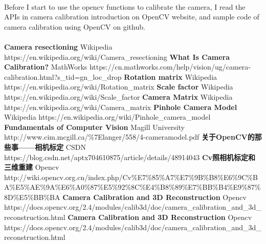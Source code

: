 \documentclass{article}
\begin{document}
\paragraph{}Before I start to use the opencv functions to calibrate the camera, I read the APIs in camera calibration introduction on OpenCV website\cite{OpencvCameraCalibration}, and sample code of camera calibration using OpenCV on github\cite{CalibrationGithub}.
\paragraph{}

\begin{thebibliography}{99}
\textbf{Camera resectioning}  Wikipedia  https://en.wikipedia.org/wiki/Camera\_resectioning
\textbf{What Is Camera Calibration?}  MathWorks  https://cn.mathworks.com/help/vision/ug/camera-calibration.html?s\_tid=gn\_loc\_drop
\textbf{Rotation matrix}  Wikipedia   https://en.wikipedia.org/wiki/Rotation\_matrix
\textbf{Scale factor}  Wikipedia  https://en.wikipedia.org/wiki/Scale\_factor
\textbf{Camera Matrix}   Wikipedia  https://en.wikipedia.org/wiki/Camera\_matrix
\textbf{Pinhole Camera Model}   Wikipedia   https://en.wikipedia.org/wiki/Pinhole\_camera\_model
\textbf{Fundamentals of Computer Vision} Magill University  http://www.cim.mcgill.ca/\%7Elanger/558/4-cameramodel.pdf
\textbf{关于OpenCV的那些事——相机标定}   CSDN   https://blog.csdn.net/aptx704610875/article/details/48914043
\textbf{Cv照相机标定和三维重建}   Opencv  http://wiki.opencv.org.cn/index.php/Cv\%E7\%85\%A7\%E7\%9B\%B8\%E6\%9C\%BA\%E5\%AE\%9A\%E6\%A0\%87\%E5\%92\%8C\%E4\%B8\%89\%E7\%BB\%B4\%E9\%87\%8D\%E5\%BB\%BA
\textbf{Camera Calibration and 3D Reconstruction} Opencv
    https://docs.opencv.org/2.4/modules/calib3d/doc/camera\_calibration\_and\_3d\_reconstruction.html
\textbf{Camera Calibration and 3D Reconstruction} Opencv
    https://docs.opencv.org/2.4/modules/calib3d/doc/camera\_calibration\_and\_3d\_reconstruction.html
\end{thebibliography}
\end{document}
